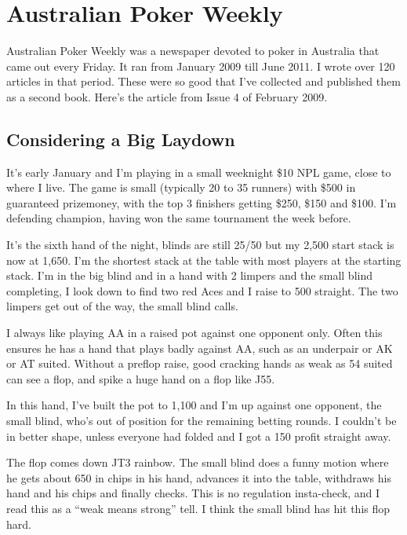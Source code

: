 \chapter{Australian Poker Weekly}


Australian Poker Weekly was a newspaper devoted to poker in Australia
that came out every Friday. It ran from January 2009 till June 2011.
I wrote over 120 articles in that period. These were so good that
I've collected and published them as a second book.
Here's the article from Issue 4 of February 2009.

\section{Considering a Big Laydown}

It's early January and I'm playing in a small weeknight \$10 NPL game,
close to where I live. The game is small (typically 20 to 35 runners) with
\$500 in guaranteed prizemoney, with the top 3 finishers getting \$250, \$150
and \$100. I'm defending champion, having won the same tournament
the week before.

It's the sixth hand of the night, blinds are still 25/50 but
my 2,500 start stack is now at 1,650. I'm the shortest stack at the
table with most players at the starting stack. I'm in the big blind and
in a hand with 2 limpers and the small blind completing, I look down to
find two red Aces and I raise to 500 straight. The two limpers get out
of the way, the small blind calls.

I always like playing AA in a raised pot against one opponent only.
Often this ensures he has a hand that plays badly against AA, such as
an underpair or AK or AT suited. Without a preflop raise, good
cracking hands as weak as 54 suited can see a flop, and spike a huge
hand on a flop like J55.

In this hand, I've built the pot to 1,100 and I'm up against one
opponent, the small blind, who's out of position for the remaining
betting rounds. I couldn't be in better shape, unless everyone had
folded and I got a 150 profit straight away.

The flop comes down JT3 rainbow. The small blind does a funny motion
where he gets about 650 in chips in his hand, advances it into the
table, withdraws his hand and his chips and finally checks. This is
no regulation insta-check, and I read this as a ``weak means strong''
tell. I think the small blind has hit this flop hard.


